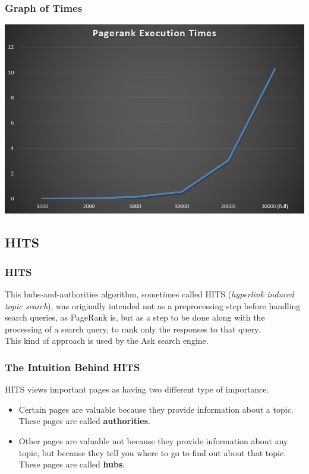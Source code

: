 \documentclass{beamer}
\begin{document}
\begin{frame}
\frametitle{Graph of Times}
\includegraphics[scale=0.5]{img/Ranking/Pagerank.PNG} 
\end{frame}

\subsection{HITS}
\begin{frame}
\frametitle{HITS}
This hubs-and-authorities algorithm, sometimes called HITS (\textit{hyperlink induced
topic search}), was originally intended not as a preprocessing step before
handling search queries, as PageRank is, but as a step to be done along with
the processing of a search query, to rank only the responses to that query.\\
\medskip
This kind of approach is  used by the Ask search engine.
\end{frame}

\begin{frame}
\frametitle{The Intuition Behind HITS}
HITS views important pages as having two different type of importance.
\begin{itemize}
\item Certain pages are valuable because they provide information about a
topic. These pages are called \textbf{authorities}.
\item Other pages are valuable not because they provide information about any
topic, but because they tell you where to go to find out about that topic.
These pages are called \textbf{hubs}.
\end{itemize}
\end{frame}
\end{document}
